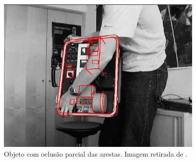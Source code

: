 \begin{figure}[ht!]
\centering
\includegraphics{monografia/occlusion.png}
\caption{Objeto com oclusão parcial das arestas. Imagem retirada de \cite{wuest}.}
\label{occlusion}
\end{figure}



